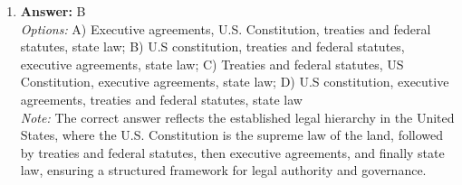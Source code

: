 \documentclass[12pt]{article}
\begin{document}
\begin{enumerate}[label=\arabic*.]
\\ \textit{Note:} The correct answer is "a or b" because, under the Fifth Amendment's Takings Clause, if a regulation constitutes a taking of private property for public use, the government is required to either compensate the property owner or modify the regulation to avoid the taking.
\item \textbf{Answer:} B
\\ \textit{Options:} A) Executive agreements, U.S. Constitution, treaties and federal statutes, state law; B) U.S constitution, treaties and federal statutes, executive agreements, state law; C) Treaties and federal statutes, US Constitution, executive agreements, state law; D) U.S constitution, executive agreements, treaties and federal statutes, state law
\\ \textit{Note:} The correct answer reflects the established legal hierarchy in the United States, where the U.S. Constitution is the supreme law of the land, followed by treaties and federal statutes, then executive agreements, and finally state law, ensuring a structured framework for legal authority and governance.
\end{enumerate}
\end{document}
